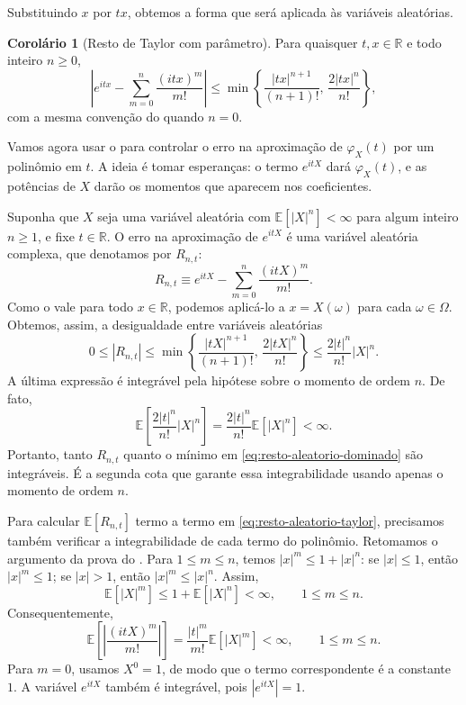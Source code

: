 \documentclass[12pt,portuguese]{article}
\theoremstyle{definition}
\newtheorem{corollary}[corollary]{Corolário}
\theoremstyle{plainexercise}
\theoremstyle{starredexercise}
\theoremstyle{definition}
\begin{document}
Substituindo $x$ por $tx$, obtemos a forma que será aplicada
às variáveis aleatórias.

\begin{corollary}[Resto de Taylor com parâmetro]\label{cor:man-resto-taylor}
Para quaisquer $t,x\in\mathbb{R}$ e todo inteiro $n\geqslant0$,
\[
\left|e^{itx}-\sum_{m=0}^n\frac{(itx)^m}{m!}\right|
\leqslant
\min\left\{
\frac{|tx|^{n+1}}{(n+1)!},\,
\frac{2|tx|^n}{n!}
\right\},
\]
com a mesma convenção do  quando $n=0$.
\end{corollary}

Vamos agora usar o  para controlar o erro
na aproximação de $\varphi_X(t)$ por um polinômio em $t$.
A ideia é tomar esperanças: o termo $e^{itX}$ dará $\varphi_X(t)$,
e as potências de $X$ darão os momentos que aparecem nos coeficientes.

Suponha que $X$ seja uma variável aleatória com
$\mathbb{E}[|X|^n]<\infty$ para algum inteiro $n\geqslant1$,
e fixe $t\in\mathbb{R}$. O erro na aproximação de $e^{itX}$
é uma variável aleatória complexa, que denotamos por $R_{n,t}$:
\begin{equation}\label{eq:resto-aleatorio-taylor}
R_{n,t}\equiv e^{itX}-\sum_{m=0}^n\frac{(itX)^m}{m!}.
\end{equation}
Como o  vale para todo $x\in\mathbb{R}$,
podemos aplicá-lo a $x=X(\omega)$ para cada $\omega\in\Omega$.
Obtemos, assim, a desigualdade entre variáveis aleatórias
\begin{equation}\label{eq:resto-aleatorio-dominado}
0\leqslant|R_{n,t}|
\leqslant\min\left\{
\frac{|tX|^{n+1}}{(n+1)!},\,
\frac{2|tX|^n}{n!}
\right\}
\leqslant\frac{2|t|^n}{n!}|X|^n.
\end{equation}
A última expressão é integrável pela hipótese sobre o momento de
ordem $n$. De fato,
\[
\mathbb{E}\left[\frac{2|t|^n}{n!}|X|^n\right]
=\frac{2|t|^n}{n!}\mathbb{E}[|X|^n]<\infty.
\]
Portanto, tanto $R_{n,t}$ quanto o mínimo em
\eqref{eq:resto-aleatorio-dominado} são integráveis.
É a segunda cota que garante essa integrabilidade usando apenas
o momento de ordem $n$.

Para calcular $\mathbb{E}[R_{n,t}]$ termo a termo em
\eqref{eq:resto-aleatorio-taylor}, precisamos também verificar
a integrabilidade de cada termo do polinômio.
Retomamos o argumento da prova do .
Para $1\leqslant m\leqslant n$, temos $|x|^m\leqslant1+|x|^n$:
se $|x|\leqslant1$, então $|x|^m\leqslant1$; se $|x|>1$,
então $|x|^m\leqslant|x|^n$. Assim,
\[
\mathbb{E}[|X|^m]
\leqslant1+\mathbb{E}[|X|^n]<\infty,
\qquad 1\leqslant m\leqslant n.
\]
Consequentemente,
\[
\mathbb{E}\left[\left|\frac{(itX)^m}{m!}\right|\right]
=\frac{|t|^m}{m!}\mathbb{E}[|X|^m]<\infty,
\qquad 1\leqslant m\leqslant n.
\]
Para $m=0$, usamos $X^0=1$, de modo que o termo correspondente
é a constante $1$. A variável $e^{itX}$ também é integrável,
pois $|e^{itX}|=1$.
\end{document}
